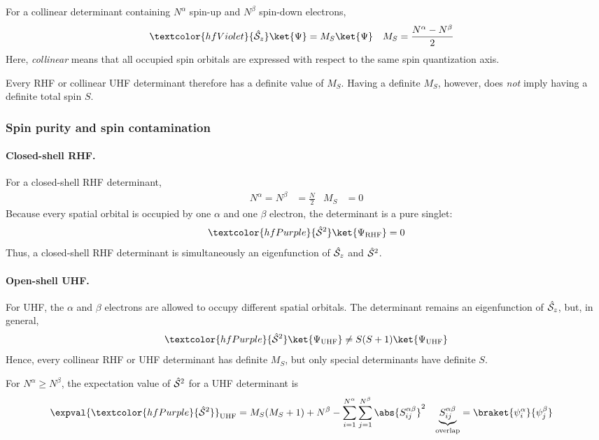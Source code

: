 \documentclass[11pt,a4paper,titlepage]{article}
\numberwithin{equation}{section}
\newcommand{\chS}{\Hat{\mathcal{S}}}
\newcommand{\purple}[1]{\textcolor{hfPurple}{#1}}
\newcommand{\violet}[1]{\textcolor{hfViolet}{#1}}
\begin{document}
For a collinear determinant containing $N^\alpha$ spin-up and $N^\beta$
spin-down electrons,
\begin{align}
  \violet{\chS_z}\ket{\Psi}
  & =
  M_S\ket{\Psi}
  &
  M_S
  & =
  \frac{N^\alpha-N^\beta}{2}
  \label{eq:ms-determinant}
\end{align}
Here, \emph{collinear} means that all occupied spin orbitals are expressed
with respect to the same spin quantization axis.

Every RHF or collinear UHF determinant therefore has a definite value of
$M_S$. Having a definite $M_S$, however, does \emph{not} imply having a
definite total spin $S$.

\subsubsection{Spin purity and spin contamination}

\paragraph{Closed-shell RHF.}

For a closed-shell RHF determinant,
\begin{align}
  N^\alpha=N^\beta&=\frac{N}{2}
  &
  M_S&=0
\end{align}
Because every spatial orbital is occupied by one $\alpha$ and one $\beta$
electron, the determinant is a pure singlet:
\begin{equation}
  \purple{\chS^2}\ket{\Psi_\text{RHF}}
  =
  0
\end{equation}
Thus, a closed-shell RHF determinant is simultaneously an eigenfunction of
$\chS_z$ and $\chS^2$.

\paragraph{Open-shell UHF.}

For UHF, the $\alpha$ and $\beta$ electrons are allowed to occupy different
spatial orbitals. The determinant remains an eigenfunction of $\chS_z$, but,
in general,
\begin{equation}
  \purple{\chS^2}\ket{\Psi_\text{UHF}}
  \neq
  S(S+1)\ket{\Psi_\text{UHF}}
\end{equation}
Hence, every collinear RHF or UHF determinant has definite $M_S$, but
only special determinants have definite $S$.

For $N^\alpha\geq N^\beta$, the expectation value of $\chS^2$ for a UHF
determinant is
\begin{align}
  \expval{\purple{\chS^2}}_\text{UHF}
  &=
  M_S(M_S+1)
  +
  N^\beta
  -
  \sum_{i=1}^{N^\alpha}
  \sum_{j=1}^{N^\beta}
  \abs{S_{ij}^{\alpha\beta}}^2
  &
  \underbrace{
  S_{ij}^{\alpha\beta}
  }_{\text{overlap}}
  &=
  \braket{\psi_i^\alpha}{\psi_j^\beta}
  \label{eq:uhf-spin-contamination}
\end{align}
\end{document}
